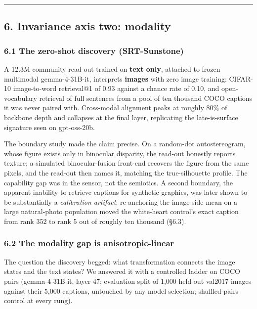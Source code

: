 \documentclass[
  11pt,
]{article}
\begin{document}
\begin{center}\rule{0.5\linewidth}{0.5pt}\end{center}

\subsection{6. Invariance axis two:
modality}\label{invariance-axis-two-modality}

\subsubsection{6.1 The zero-shot discovery
(SRT-Sunstone)}\label{the-zero-shot-discovery-srt-sunstone}

A 12.3M community read-out trained on \textbf{text only}, attached to
frozen multimodal gemma-4-31B-it, interprets \textbf{images} with zero
image training: CIFAR-10 image-to-word retrieval@1 of 0.93 against a
chance rate of 0.10, and open-vocabulary retrieval of full sentences
from a pool of ten thousand COCO captions it was never paired with.
Cross-modal alignment peaks at roughly 80\% of backbone depth and
collapses at the final layer, replicating the late-is-surface signature
seen on gpt-oss-20b.

The boundary study made the claim precise. On a random-dot
autostereogram, whose figure exists only in binocular disparity, the
read-out honestly reports texture; a simulated binocular-fusion
front-end recovers the figure from the same pixels, and the read-out
then names it, matching the true-silhouette profile. The capability gap
was in the sensor, not the semiotics. A second boundary, the apparent
inability to retrieve captions for synthetic graphics, was later shown
to be substantially a \emph{calibration artifact}: re-anchoring the
image-side mean on a large natural-photo population moved the
white-heart control's exact caption from rank 352 to rank 5 out of
roughly ten thousand (§6.3).

\subsubsection{6.2 The modality gap is
anisotropic-linear}\label{the-modality-gap-is-anisotropic-linear}

The question the discovery begged: what transformation connects the
image states and the text states? We answered it with a controlled
ladder on COCO pairs (gemma-4-31B-it, layer 47; evaluation split of
1,000 held-out val2017 images against their 5,000 captions, untouched by
any model selection; shuffled-pairs control at every rung).
\end{document}
